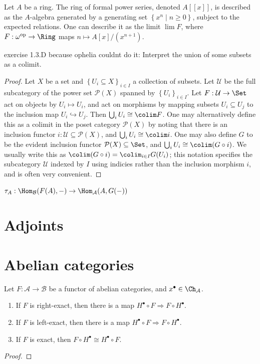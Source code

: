 \begin{example}
	Let $A$ be a ring. The ring of formal power series, denoted $A[[x]]$, is described as the $A$-algebra generated by a generating set $\left\{ x^n\mid n\geq 0 \right\} $, subject to the expected relations. One can describe it as the limit $\lim F$, where $F : \omega^{\mathrm{op}}  \to \Ring $ maps $n\mapsto A[x]/(x^{n+1} )$.
\end{example}

exercise 1.3.D because ophelia couldnt do it: Interpret the union of some subsets as a colimit.

\begin{proof}
	Let $X$ be a set and $ \left\{ U_i \subseteq X \right\}_{i\in I} $ a collection of subsets. Let $\mathcal{U} $ be the full subcategory of the power set $\mathcal{P} (X)$ spanned by $\left\{ U_i \right\} _{i\in I} $. Let $F : \mathcal{U}  \to \Set $ act on objects by $U_i \mapsto U_i$, and act on morphisms by mapping subsets $U_i \subseteq U_j$ to the inclusion map $U_i \hookrightarrow U_j$. Then $\bigcup_{i} U_i\cong \colim F$. One may alternatively define this as a colimit in the poset category $\mathcal{P} (X)$ by noting that there is an inclusion functor $i : \mathcal{U} \subseteq \mathcal{P} (X)$, and $\bigcup_{i} U_i \cong \colim i$. One may also define $G$ to be the evident inclusion functor $\mathcal{P} (X) \subseteq \Set $, and $\bigcup_{i} U_i \cong \colim (G\circ i)$. We usually write this as $\colim (G\circ i) = \colim_{i\in I} G(U_i)$; this notation specifies the subcategory $\mathcal{U} $ indexed by $I$ using indicies rather than the inclusion morphism $i$, and is often very convenient.
\end{proof}

$\tau _{A} : \Hom_{\mathcal{B} }(F(A), -)  \to \Hom_{\mathcal{A} }(A, G(-)) $
\section{Adjoints}

\section{Abelian categories}

\begin{exercise}[FHHF]
	Let $F : \mathcal{A}  \to \mathcal{B} $ be a functor of abelian categories, and $x^{\bullet} \in \Ch_{\mathcal{A} } $.
	\begin{enumerate}
		\item If $F$ is right-exact, then there is a map $H^{\bullet}\circ  F \Rightarrow F\circ H^{\bullet} $.
		\item If $F$ is left-exact, then there is a map $H^{\bullet} \circ F \Rightarrow F\circ H^{\bullet} $.
		\item If $F$ is exact, then $F\circ H^{\bullet} \cong H^{\bullet} \circ F$.
	\end{enumerate}
\end{exercise}
\begin{proof}
	
\end{proof}
